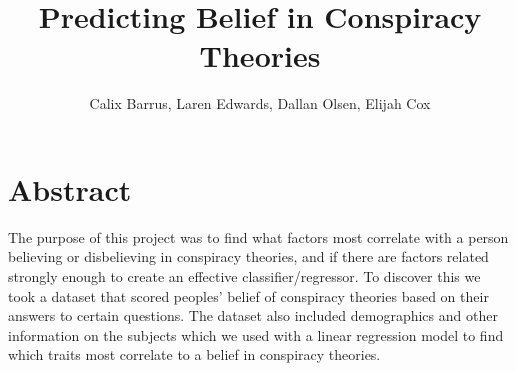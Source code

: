 \documentclass[11pt]{article}
\author{Calix Barrus, Laren Edwards, Dallan Olsen, Elijah Cox}
\title{Predicting Belief in Conspiracy Theories}
\begin{document}
    
    \maketitle
    
    

    
    \hypertarget{abstract}{%
\section*{Abstract}\label{abstract}}

The purpose of this project was to find what factors most correlate with
a person believing or disbelieving in conspiracy theories, and if there
are factors related strongly enough to create an effective
classifier/regressor. To discover this we took a dataset that scored
peoples' belief of conspiracy theories based on their answers to certain
questions. The dataset also included demographics and other information
on the subjects which we used with a linear regression model to find
which traits most correlate to a belief in conspiracy theories.
\end{document}

